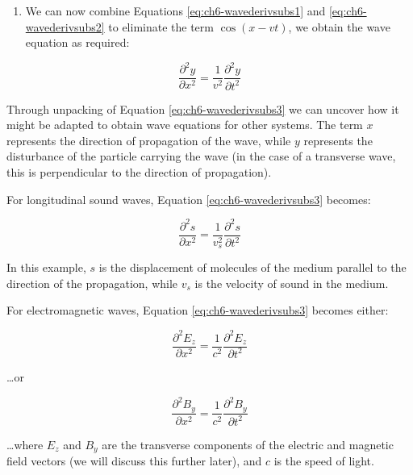 \documentclass[
]{book}
\providecommand{\tightlist}{%
  \setlength{\itemsep}{0pt}\setlength{\parskip}{0pt}}
\begin{document}
\begin{enumerate}
\def\labelenumi{\arabic{enumi}.}
\setcounter{enumi}{2}
\tightlist
\item
  We can now combine Equations \eqref{eq:ch6-wavederivsubs1} and \eqref{eq:ch6-wavederivsubs2} to eliminate the term \(\cos(x - vt)\), we obtain the wave equation as required:
\end{enumerate}

\begin{equation}
\frac{\partial^2 y}{\partial x^2} = \frac{1}{v^2} \frac{\partial^2 y}{\partial t^2}
\label{eq:ch6-wavederivsubs3}
\end{equation}

Through unpacking of Equation \eqref{eq:ch6-wavederivsubs3} we can uncover how it might be adapted to obtain wave equations for other systems. The term \(x\) represents the direction of propagation of the wave, while \(y\) represents the disturbance of the particle carrying the wave (in the case of a transverse wave, this is perpendicular to the direction of propagation).

For longitudinal sound waves, Equation \eqref{eq:ch6-wavederivsubs3} becomes:

\begin{equation}
\frac{\partial^2 s}{\partial x^2} = \frac{1}{v_s^2} \frac{\partial^2 s}{\partial t^2}
\label{eq:ch6-wavederivsubs4}
\end{equation}

In this example, \(s\) is the displacement of molecules of the medium parallel to the direction of the propagation, while \(v_s\) is the velocity of sound in the medium.

For electromagnetic waves, Equation \eqref{eq:ch6-wavederivsubs3} becomes either:

\begin{equation}
\frac{\partial^2 E_z}{\partial x^2} = \frac{1}{c^2} \frac{\partial^2 E_z}{\partial t^2}
\label{eq:ch6-wavederivsubs5}
\end{equation}

\ldots or

\begin{equation}
\frac{\partial^2 B_y}{\partial x^2} = \frac{1}{c^2} \frac{\partial^2 B_y}{\partial t^2}
\label{eq:ch6-wavederivsubs5b}
\end{equation}

\ldots where \(E_z\) and \(B_y\) are the transverse components of the electric and magnetic field vectors (we will discuss this further later), and \(c\) is the speed of light.
\end{document}
